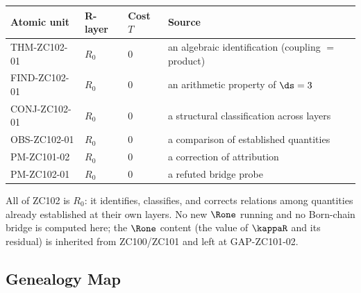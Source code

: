 \documentclass[12pt, a4paper]{article}
\begin{document}
\begin{layerbox}[title={R-Layer Assignments for ZC102}]
{\small\renewcommand{\arraystretch}{1.25}
\begin{center}
\begin{tabular}{@{}llll@{}}
\toprule
Atomic unit & R-layer & Cost $T$ & Source \\
\midrule
THM-ZC102-01 & $R_0$ & $0$ & an algebraic identification (coupling $=$ product) \\
FIND-ZC102-01 & $R_0$ & $0$ & an arithmetic property of $\ds=3$ \\
CONJ-ZC102-01 & $R_0$ & $0$ & a structural classification across layers \\
OBS-ZC102-01 & $R_0$ & $0$ & a comparison of established quantities \\
PM-ZC101-02  & $R_0$ & $0$ & a correction of attribution \\
PM-ZC102-01  & $R_0$ & $0$ & a refuted bridge probe \\
\bottomrule
\end{tabular}
\end{center}}
All of ZC102 is $R_0$: it identifies, classifies, and corrects relations among
quantities already established at their own layers. No new $\Rone$ running and no
Born-chain bridge is computed here; the $\Rone$ content (the value of $\kappaR$
and its residual) is inherited from ZC100/ZC101 and left at GAP-ZC101-02.
\end{layerbox}

\subsection{Genealogy Map}
\label{sec:genealogy-zc102}
\end{document}
